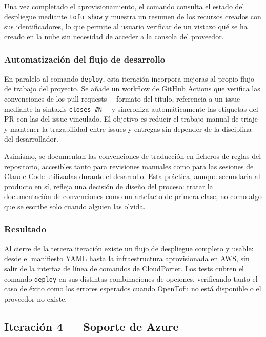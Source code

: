 Una vez completado el aprovisionamiento, el comando consulta el estado del despliegue
mediante \texttt{tofu show} y muestra un resumen de los recursos creados con sus
identificadores, lo que permite al usuario verificar de un vistazo qué se ha creado en
la nube sin necesidad de acceder a la consola del proveedor.

\subsubsection{Automatización del flujo de desarrollo}

En paralelo al comando \texttt{deploy}, esta iteración incorpora mejoras al propio flujo
de trabajo del proyecto. Se añade un workflow de GitHub Actions que verifica las convenciones
de los pull requests —formato del título, referencia a un issue mediante la sintaxis
\texttt{closes \#N}— y sincroniza automáticamente las etiquetas del PR con las del issue
vinculado. El objetivo es reducir el trabajo manual de triaje y mantener la trazabilidad
entre issues y entregas sin depender de la disciplina del desarrollador.

Asimismo, se documentan las convenciones de traducción en ficheros de reglas del repositorio,
accesibles tanto para revisiones manuales como para las sesiones de Claude Code utilizadas
durante el desarrollo. Esta práctica, aunque secundaria al producto en sí, refleja una decisión
de diseño del proceso: tratar la documentación de convenciones como un artefacto de primera
clase, no como algo que se escribe solo cuando alguien las olvida.

\subsubsection{Resultado}

Al cierre de la tercera iteración existe un flujo de despliegue completo y usable: desde
el manifiesto YAML hasta la infraestructura aprovisionada en AWS, sin salir de la interfaz
de línea de comandos de CloudPorter. Los tests cubren el comando \texttt{deploy} en sus
distintas combinaciones de opciones, verificando tanto el caso de éxito como los errores
esperados cuando OpenTofu no está disponible o el proveedor no existe.

\subsection{Iteración 4 — Soporte de Azure}
\label{sec:iter4}

